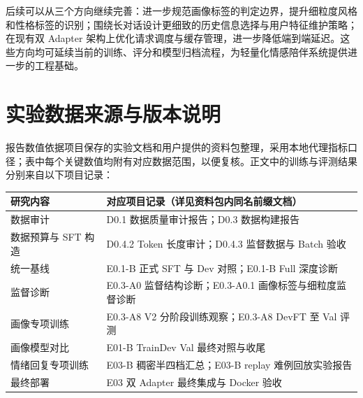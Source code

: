 \documentclass[UTF8,a4paper,zihao=-4,oneside]{ctexrep}
\begin{document}
后续可以从三个方向继续完善：进一步规范画像标签的判定边界，提升细粒度风格和性格标签的识别；围绕长对话设计更细致的历史信息选择与用户特征维护策略；在现有双 Adapter 架构上优化请求调度与缓存管理，进一步降低端到端延迟。这些方向均可延续当前的训练、评分和模型归档流程，为轻量化情感陪伴系统提供进一步的工程基础。

\appendix
\chapter{实验数据来源与版本说明}
报告数值依据项目保存的实验文档和用户提供的资料包整理，采用本地代理指标口径；表中每个关键数值均附有对应数据范围，以便复核。正文中的训练与评测结果分别来自以下项目记录：
\begin{longtable}{p{3.15cm}p{9.35cm}}
\toprule
研究内容 & 对应项目记录（详见资料包内同名前缀文档）\\\midrule\endhead
数据审计 & D0.1 数据质量审计报告；D0.3 数据构建报告\\
数据预算与 SFT 构造 & D0.4.2 Token 长度审计；D0.4.3 监督数据与 Batch 验收\\
统一基线 & E0.1-B 正式 SFT 与 Dev 对照；E0.1-B Full 深度诊断\\
监督诊断 & E0.3-A0 监督结构诊断；E0.3-A0.1 画像标签与细粒度监督诊断\\
画像专项训练 & E0.3-A8 V2 分阶段训练观察；E0.3-A8 DevFT 至 Val 评测\\
画像模型对比 & E01-B TrainDev Val 最终对照与收尾\\
情绪回复专项训练 & E03-B 稠密半四档汇总；E03-B replay 难例回放实验报告\\
最终部署 & E03 双 Adapter 最终集成与 Docker 验收\\
\bottomrule
\end{longtable}
\end{document}
